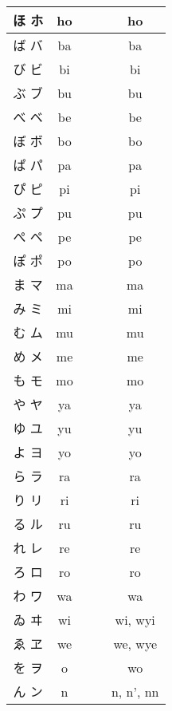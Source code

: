 \documentclass{article}
\begin{document}
\begin{center}
\begin{japanese}
\begin{longtable}{|c|c c c|c|}
                ほ ホ & ho &&& ho \\ \hline
                ば バ & ba &&& ba \\ \hline
                び ビ & bi &&& bi \\ \hline
                ぶ ブ & bu &&& bu \\ \hline
                べ ベ & be &&& be \\ \hline
                ぼ ボ & bo &&& bo \\ \hline
                ぱ パ & pa &&& pa \\ \hline
                ぴ ピ & pi &&& pi \\ \hline
                ぷ プ & pu &&& pu \\ \hline
                ぺ ペ & pe &&& pe \\ \hline
                ぽ ポ & po &&& po \\ \hline
                ま マ & ma &&& ma \\ \hline
                み ミ & mi &&& mi \\ \hline
                む ム & mu &&& mu \\ \hline
                め メ & me &&& me \\ \hline
                も モ & mo &&& mo \\ \hline
                や ヤ & ya &&& ya \\ \hline
                ゆ ユ & yu &&& yu \\ \hline
                よ ヨ & yo &&& yo \\ \hline
                ら ラ & ra &&& ra \\ \hline
                り リ & ri &&& ri \\ \hline
                る ル & ru &&& ru \\ \hline
                れ レ & re &&& re \\ \hline
                ろ ロ & ro &&& ro \\ \hline
                わ ワ & wa &&& wa \\ \hline
                ゐ ヰ & wi &&& wi, wyi \\ \hline
                ゑ ヱ & we &&& we, wye \\ \hline
                を ヲ & o &&& wo \\ \hline
                ん ン & n &&& n, n', nn \\ \hline

\end{longtable}
\end{japanese}
\end{center}
\end{document}
